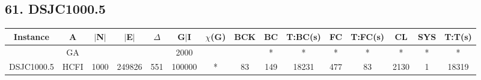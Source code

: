 \documentclass[10pt]{article}
\begin{document}
\subsection*{\hspace{0,9073976cm} 61. DSJC1000.5}
\begin{table}[H]
\centering
\begin{tabular}{|c|c|c|c|c|c|c|c|c|c|c|c|c|c|c|}
\hline
Instance& A &$|$N$|$ & $|$E$|$ & $\Delta$ & G$|$I & $\chi$(G) &BCK&BC & T:BC(s) & FC & T:FC(s) & CL & SYS & T:T(s) \\ \hline \hline

	&GA&       &                   &                     &  2000       &     \cellcolor{yellow} & {\cellcolor{yellow}}& {{\cellcolor{green}*}}
& *  &*        &*                   &*                    & *         &*        \\ \cline{2-2} \cline{6-6} \cline{9-15}
 \multirow{-2}{*}{DSJC1000.5} &HCFI   &\multirow{-2}{*}{1000}   &\multirow{-2}{*}{249826}     &\multirow{-2}{*}{551}     &100000     &\multirow{-2}{*}{\cellcolor{yellow}*}      & \multirow{-2}{*}{\cellcolor{yellow}83}    &{\cellcolor{green}149}     &18231         &477    &        83 &2130    &1     & 18319       \\ \hline
\end{tabular}
\end{table}
\begin{comment}
\graphicspath{{./Core1/Solutions/GA/DSJC1000.5.col}}
\begin{figure}[H]
\begin{subfigure}{.33\textwidth}
  \centering
  \texttt{[image: DSJC1000.5.col\\\_Algorithm\\\_analysis.png]}
  \caption{GA-Algorithm analysis}
   \label{fig:subfig1}
\end{subfigure}%
\begin{subfigure}{.33\textwidth}
  \centering
  \texttt{[image: DSJC1000.5.col\\\_Graph\\\_coloring.png]}
  \caption{GA-Graph coloring}
  \label{fig:subfig2}
\end{subfigure}
\begin{subfigure}{.33\textwidth}
  \centering
  \texttt{[image: DSJC1000.5.col\\\_Time\\\_analysis.png]}
  \caption{GA-Time analysis}
  \end{subfigure}
\end{figure}
\end{comment}
\graphicspath{{./Core1/Solutions/HCFI/DSJC1000.5.col}}
\end{document}
